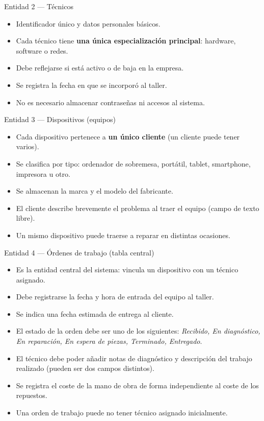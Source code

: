 \documentclass[12pt,a4paper]{article}
\begin{document}
\vspace{0.25cm}

\begin{tablabox}{Entidad 2 — Técnicos}
\begin{itemize}
  \item Identificador único y datos personales básicos.
  \item Cada técnico tiene \textbf{una única especialización principal}: hardware, software o redes.
  \item Debe reflejarse si está activo o de baja en la empresa.
  \item Se registra la fecha en que se incorporó al taller.
  \item No es necesario almacenar contraseñas ni accesos al sistema.
\end{itemize}
\end{tablabox}

\vspace{0.25cm}

\begin{tablabox}{Entidad 3 — Dispositivos (equipos)}
\begin{itemize}
  \item Cada dispositivo pertenece a \textbf{un único cliente} (un cliente puede tener varios).
  \item Se clasifica por tipo: ordenador de sobremesa, portátil, tablet, smartphone, impresora u otro.
  \item Se almacenan la marca y el modelo del fabricante.
  \item El cliente describe brevemente el problema al traer el equipo (campo de texto libre).
  \item Un mismo dispositivo puede traerse a reparar en distintas ocasiones.
\end{itemize}
\end{tablabox}

\vspace{0.25cm}

\begin{tablabox}{Entidad 4 — Órdenes de trabajo (tabla central)}
\begin{itemize}
  \item Es la entidad central del sistema: vincula un dispositivo con un técnico asignado.
  \item Debe registrarse la fecha y hora de entrada del equipo al taller.
  \item Se indica una fecha estimada de entrega al cliente.
  \item El estado de la orden debe ser uno de los siguientes: \textit{Recibido, En diagnóstico,
        En reparación, En espera de piezas, Terminado, Entregado}.
  \item El técnico debe poder añadir notas de diagnóstico y descripción del trabajo realizado
        (pueden ser dos campos distintos).
  \item Se registra el coste de la mano de obra de forma independiente al coste de los repuestos.
  \item Una orden de trabajo puede no tener técnico asignado inicialmente.
\end{itemize}
\end{tablabox}
\end{document}
